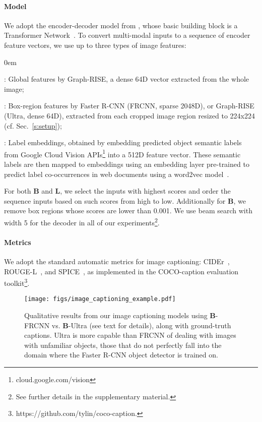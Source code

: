 \documentclass[11pt,a4paper]{article}
\begin{document}
\paragraph{Model}
We adopt the encoder-decoder model from \cite{sharma2018conceptual}, whose basic building block is a Transformer Network~\cite{vaswani2017attention}.
To convert multi-modal inputs to a sequence of encoder feature vectors,  we use up to three types of image features:
\begin{description}
\itemsep0em
\item[G]: Global features by Graph-RISE, a dense 64D vector extracted from the whole image; \item[B]: Box-region features by Faster R-CNN (FRCNN, sparse 2048D), or Graph-RISE (Ultra, dense 64D), extracted from each cropped image region resized to 224x224 (cf. Sec.~\ref{s:setup});
\item[L]: Label embeddings, obtained by embedding predicted object semantic labels from Google Cloud Vision APIs\footnote{cloud.google.com/vision} into a 512D feature vector.
These semantic labels are then mapped to embeddings using an embedding layer pre-trained to predict label co-occurrences in web documents using a word2vec model~\cite{mikolov-et-al:2013a}.
\end{description}

For both {\bf B} and {\bf L}, we select the inputs with highest scores and order the sequence inputs based on such scores from high to low.
Additionally for {\bf B}, we remove box regions whose scores are lower than 0.001.
We use beam search with width 5 for the decoder in all of our experiments\footnote{See further details in the supplementary material.}.

\paragraph{Metrics}
We adopt the standard automatic metrics for image captioning:
CIDEr~\citep{cider}, ROUGE-L~\cite{lin-och:2004}, and SPICE~\cite{spice}, as implemented in the COCO-caption evaluation toolkit\footnote{https://github.com/tylin/coco-caption.}.

\begin{figure*}[t]
\begin{center}
 \texttt{[image: figs/image\_captioning\_example.pdf]}
\end{center}
 \vspace{-6pt}
 \caption{Qualitative results from our image captioning models using {\bf B}-FRCNN vs. {\bf B}-Ultra (see text for details), along with ground-truth captions.
 Ultra is more capable than FRCNN of dealing with images with unfamiliar objects,
 those that do not perfectly fall into the domain where the Faster R-CNN object detector is trained on.}
\label{fig:cap_examples}
\vspace{-12pt}
\end{figure*}
\end{document}
